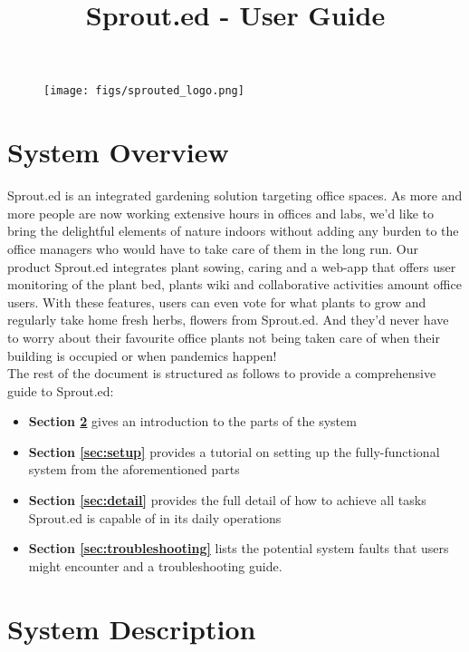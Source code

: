 \documentclass{article}
\title{Sprout.ed - User Guide}
\begin{document}
 

\maketitle{}

\begin{figure}[h]
    \centering
    \texttt{[image: figs/sprouted\_logo.png]}
    \label{fig:logo}
\end{figure}



\section{System Overview} \label{sec:overview}
Sprout.ed is an integrated gardening solution targeting office spaces. 
As more and more people are now working extensive hours in offices and labs, we’d like to bring the delightful elements of nature indoors without adding any burden to the office managers who would have to take care of them in the long run.
Our product Sprout.ed integrates plant sowing, caring and a web-app that offers user monitoring of the plant bed, plants wiki and collaborative activities amount office users. With these features, users can even vote for what plants to grow and regularly take home fresh herbs, flowers from Sprout.ed. And they’d never have to worry about their favourite office plants not being taken care of when their building is occupied or when pandemics happen! \\

The rest of the document is structured as follows to provide a comprehensive guide to Sprout.ed:
\begin{itemize}
    \item \textbf{Section \ref{sec:description}} gives an introduction to the parts of the system
    \item \textbf{Section \ref{sec:setup}} provides a tutorial on setting up the fully-functional system from the aforementioned parts
    \item \textbf{Section \ref{sec:detail}} provides the full detail of how to achieve all tasks Sprout.ed is capable of in its daily operations
    \item \textbf{Section \ref{sec:troubleshooting}} lists the potential system faults that users might encounter and a troubleshooting guide.
\end{itemize}



\section{System Description}\label{sec:description}
\end{document}

